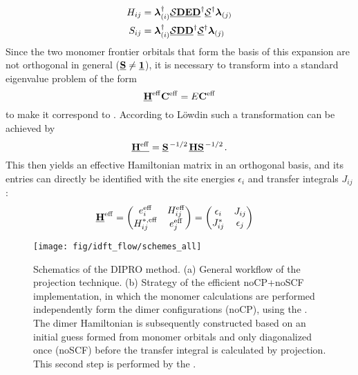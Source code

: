  \begin{equation}
  \begin{aligned}
     H_{ij} &= {\mathbf{\boldsymbol{\lambda}}}_{(i)}^\dagger \underline{\mathbf{\mathcal{S}}} 
\underline{\mathbf{D}} \underline{\mathbf{E}} \underline{\mathbf{D}}^\dagger \underline{\mathbf{\mathcal{S}}}^\dagger 
{\ensuremath\mathbf{\boldsymbol{\lambda}}}_{(j)}  \\
     S_{ij} &= {\mathbf{\boldsymbol{\lambda}}}_{(i)}^\dagger \underline{\mathbf{\mathcal{S}}} 
\underline{\mathbf{D}}  \underline{\mathbf{D}}^\dagger \underline{\mathbf{\mathcal{S}}}^\dagger 
{\ensuremath\mathbf{\boldsymbol{\lambda}}}_{(j)} 
  \end{aligned}
   \label{eq:dipro_eq20}
 \end{equation}
%
Since the two monomer frontier orbitals that form the basis of this expansion 
are not orthogonal in general ($\underline{\mathbf{S}} \neq \underline{\mathbf{1}}$), it is necessary to 
transform  into a standard eigenvalue problem of the form
%
\begin{equation}
  \underline{\mathbf{H}}^{\mathrm{eff}} {\mathbf{C}}^{\mathrm{eff}} =   E {\mathbf{C}}^{\mathrm{eff}} 
  \label{eq:dipro_eq7}
\end{equation}
%
to make it correspond to . According to L\"owdin such a 
transformation can be achieved by
%
\begin{equation}
  \underline{\mathbf{H^\mathrm{eff}}} = \underline{\mathbf{S}}^{\left. {-1} \middle/ {2} \right.}
  \underline{\mathbf{H}}\underline{\mathbf{S}}^{\left. {-1} \middle/ {2} \right.}.
  \label{eq:dipro_eq9}
\end{equation}
%
This then yields an effective Hamiltonian matrix in an orthogonal basis, and its 
entries can directly be identified with the site energies $\epsilon_i$ and 
transfer integrals $J_{ij}$:
%
\begin{equation}
 \begin{aligned}
  \underline{\mathbf{H}}^{\mathrm{eff}} &= 
    \begin{pmatrix}
      e_i^{\mathrm{eff}}    &  H_{ij}^\mathrm{eff} \\
      H_{ij}^{*,\mathrm{eff}}   &  e_j^\mathrm{eff}  
    \end{pmatrix} =
    \begin{pmatrix}
      \epsilon_i    &  J_{ij} \\
      J_{ij}^*      &  \epsilon_j  
    \end{pmatrix} 
 \end{aligned}
  \label{eq:dipro_eq11}
\end{equation}

 \begin{figure}[htb]
     \center
     \texttt{[image: fig/idft\_flow/schemes\_all]}
     \caption{Schematics of the DIPRO method. (a) General workflow of the 
projection technique. (b) Strategy of the efficient noCP+noSCF implementation, 
in which the monomer calculations are performed independently form the dimer 
configurations (noCP), using the  \calculator. The dimer Hamiltonian 
is subsequently constructed based on an initial guess formed from monomer 
orbitals and only diagonalized once (noSCF) before the transfer integral is 
calculated by projection. This second step is performed by the  
\calculator. }
     \label{fig:dipro_scheme}
 \end{figure}

